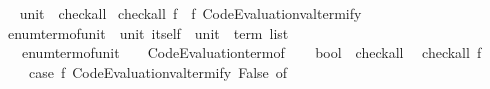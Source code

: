 \begin{isabellebody}
\isanewline
{}\isamarkupfalse%
%
\isadelimproof
\ %
\endisadelimproof
%
\isatagproof
\isacommand{{\isachardot}{\kern0pt}{\isachardot}{\kern0pt}}\isamarkupfalse%
%
\endisatagproof
{\isafoldproof}%
%
\isadelimproof
%
\endisadelimproof
\isanewline
\isanewline
{}\isamarkupfalse%
\isanewline
\isanewline
{}\isamarkupfalse%
\ unit\ {\isacharcolon}{\kern0pt}{\isacharcolon}{\kern0pt}\ check{\isacharunderscore}{\kern0pt}all\isanewline
{}\isanewline
\isanewline
{}\isamarkupfalse%
\ {\isachardoublequoteopen}check{\isacharunderscore}{\kern0pt}all\ f\ {\isacharequal}{\kern0pt}\ f\ {\isacharparenleft}{\kern0pt}Code{\isacharunderscore}{\kern0pt}Evaluation{\isachardot}{\kern0pt}valtermify\ {\isacharparenleft}{\kern0pt}{\isacharparenright}{\kern0pt}{\isacharparenright}{\kern0pt}{\isachardoublequoteclose}\isanewline
\isanewline
{}\isamarkupfalse%
\ enum{\isacharunderscore}{\kern0pt}term{\isacharunderscore}{\kern0pt}of{\isacharunderscore}{\kern0pt}unit\ {\isacharcolon}{\kern0pt}{\isacharcolon}{\kern0pt}\ {\isachardoublequoteopen}unit\ itself\ {\isasymRightarrow}\ unit\ {\isasymRightarrow}\ term\ list{\isachardoublequoteclose}\isanewline
\ \ \ {\isachardoublequoteopen}enum{\isacharunderscore}{\kern0pt}term{\isacharunderscore}{\kern0pt}of{\isacharunderscore}{\kern0pt}unit\ {\isacharequal}{\kern0pt}\ {\isacharparenleft}{\kern0pt}{\isasymlambda}{\isacharunderscore}{\kern0pt}\ {\isacharunderscore}{\kern0pt}{\isachardot}{\kern0pt}\ {\isacharbrackleft}{\kern0pt}Code{\isacharunderscore}{\kern0pt}Evaluation{\isachardot}{\kern0pt}term{\isacharunderscore}{\kern0pt}of\ {\isacharparenleft}{\kern0pt}{\isacharparenright}{\kern0pt}{\isacharbrackright}{\kern0pt}{\isacharparenright}{\kern0pt}{\isachardoublequoteclose}\isanewline
\isanewline
{}\isamarkupfalse%
%
\isadelimproof
\ %
\endisadelimproof
%
\isatagproof
\isacommand{{\isachardot}{\kern0pt}{\isachardot}{\kern0pt}}\isamarkupfalse%
%
\endisatagproof
{\isafoldproof}%
%
\isadelimproof
%
\endisadelimproof
\isanewline
\isanewline
{}\isamarkupfalse%
\isanewline
\isanewline
\isanewline
{}\isamarkupfalse%
\ bool\ {\isacharcolon}{\kern0pt}{\isacharcolon}{\kern0pt}\ check{\isacharunderscore}{\kern0pt}all\isanewline
{}\isanewline
\isanewline
{}\isamarkupfalse%
\isanewline
\ \ {\isachardoublequoteopen}check{\isacharunderscore}{\kern0pt}all\ f\ {\isacharequal}{\kern0pt}\isanewline
\ \ \ \ {\isacharparenleft}{\kern0pt}case\ f\ {\isacharparenleft}{\kern0pt}Code{\isacharunderscore}{\kern0pt}Evaluation{\isachardot}{\kern0pt}valtermify\ False{\isacharparenright}{\kern0pt}\ of\isanewline

\end{isabellebody}
